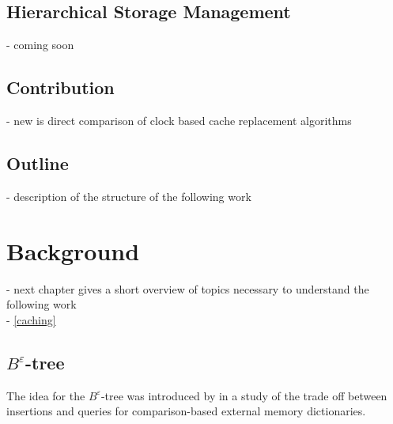 \documentclass[
	12pt,
	a4paper,
	abstract,
	bibliography=totoc,
	chapterprefix,
	headings=openright,
	numbers=endperiod,
	parskip=half,
	twoside,
]{scrreprt}
\begin{document}
\section{Hierarchical Storage Management}

- coming soon

\section{Contribution}
- new is direct comparison of clock based cache replacement algorithms\\

\section{Outline}
- description of the structure of the following work\\


\chapter{Background}
\label{cha:background}


- next chapter gives a short overview of topics necessary to understand the following work\\
- \ref{caching}

\section{$B^{\varepsilon}$-tree}
\label{sec:tree}


The idea for the $B^{\varepsilon}$-tree was introduced by \cite{brodal2003lower} in a study of the trade off between insertions and queries for comparison-based external memory dictionaries.
\end{document}
